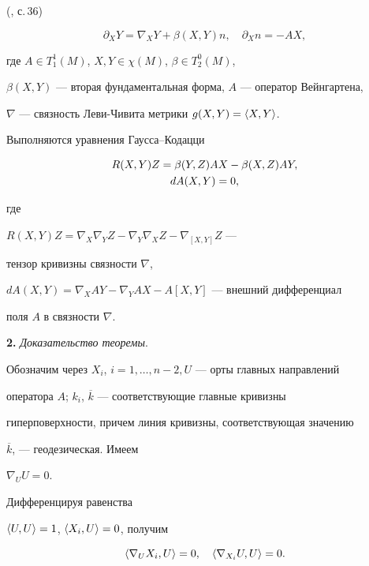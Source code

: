 (\cite{2}, с.\,36)


$$


\partial_X Y = \nabla_X Y + \beta(X,Y)n, \quad


\partial_X n = - AX,


$$


где $A\in T_1^1 (M)$, $X,Y\in\chi(M)$, $\beta\in T_2^0 (M)$,


$\beta(X,Y)$ --- вторая фундаментальная форма, $A$ --- оператор Вейнгартена,


$\nabla$ --- связность Леви-Чивита метрики $g(X,Y)=\langle X,Y\rangle$.





Выполняются уравнения Гаусса--Кодацци


\begin{gather}


R(X,Y)Z = \beta(Y,Z)AX - \beta(X,Z)AY,\\


dA(X,Y)=0,\notag


\end{gather}


где


$R(X,Y)Z=\nabla_X\nabla_Y Z-\nabla_Y\nabla_X Z-\nabla_{[X,Y]}Z$ ---


тензор кривизны связности $\nabla$,


$dA(X,Y)=\nabla_X AY-\nabla_Y AX-A [X,Y]$ --- внешний дифференциал


поля $A$ в связности $\nabla$.


\medskip





{\bf 2.} {\it Доказательство теоремы}.


Обозначим через $X_i$, $i=1,\dotsc,n-2,U$ --- орты главных направлений


оператора $A$; $k_i$, $\overline{k}$ --- соответствующие главные кривизны


гиперповерхности, причем линия кривизны, соответствующая значению


$\overline{k}$, --- геодезическая. Имеем


$\nabla _UU=0$.


Дифференцируя равенства


$\langle U,U\rangle =1$, $\langle X_i,U\rangle=0$, получим


\begin{equation}


\la\nabla_U X_i,U\ra=0,\quad \la\nabla_{X_i}U,U\ra =0.


\end{equation}






